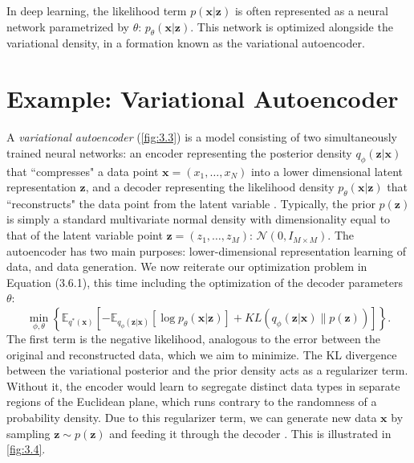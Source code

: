 \documentclass[honours,12pt, twoside]{unswthesis}
\newcommand{\E}{\mathbb{E}}
\numberwithin{equation}{section}
\theoremstyle{definition}
\begin{document}
In deep learning, the likelihood term $p(\bm{x}|\bm{z})$ is often represented as a neural network parametrized by $\theta$: $p_\theta(\bm{x}|\bm{z})$. This network is optimized alongside the variational density, in a formation known as the variational autoencoder.
\section{Example: Variational Autoencoder}\label{sec:3.7}
A \textit{variational autoencoder} (\autoref{fig:3.3}) is a model consisting of two simultaneously trained neural networks: an encoder representing the posterior density $q_\phi(\bm{z}|\bm{x})$ that ``compresses" a data point $\bm{x}=(x_1,\dots,x_N)$ into a lower dimensional latent representation $\bm{z}$, and a decoder representing the likelihood density $p_\theta(\bm{x}|\bm{z})$ that ``reconstructs" the data point from the latent variable \citep{kingma}. Typically, the prior $p(\bm{z})$ is simply a standard multivariate normal density with dimensionality equal to that of the latent variable point $\bm{z}=(z_1,\dots,z_M)$: $\mathcal{N}(0,I_{M\times M})$. The autoencoder has two main purposes: lower-dimensional representation learning of data, and data generation. We now reiterate our optimization problem in Equation (3.6.1), this time including the optimization of the decoder parameters $\theta$:
\begin{equation}
\min_{\phi,\theta} \left\lbrace\mathbb{E}_{q^*(\bm{x})}\left[-\E_{q_\phi(\bm{z}|\bm{x})}[\log p_\theta(\bm{x}|\bm{z})]+KL(q_\phi(\bm{z}|\bm{x})\|p(\bm{z}))\right]\right\rbrace.
\end{equation}
The first term is the negative likelihood, analogous to the error between the original and reconstructed data, which we aim to minimize. The KL divergence between the variational posterior and the prior density acts as a regularizer term. Without it, the encoder would learn to segregate distinct data types in separate regions of the Euclidean plane, which runs contrary to the randomness of a probability density. Due to this regularizer term, we can generate new data $\bm{x}$ by sampling $\bm{z}\sim p(\bm{z})$ and feeding it through the decoder \citep{vae}. This is illustrated in \autoref{fig:3.4}.
\end{document}

